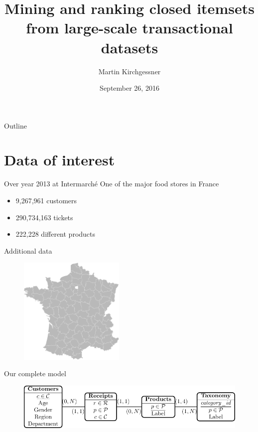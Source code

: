 \documentclass[table]{beamer}
\title[PhD defense]{Mining and ranking closed itemsets from large-scale transactional datasets}
\author[M. Kirchgessner]{Martin Kirchgessner}
\institute[LIG]{
  Laboratoire d'Informatique de Grenoble\\
	\texttt{martin.kirchgessner@imag.fr}
}
\date[September 26, 2016]{September 26, 2016}
\begin{document}
\begin{frame}[plain]
	\titlepage
\end{frame}

\begin{frame}{Outline}
  \tableofcontents
\end{frame}




\section{Data of interest}


\begin{frame}{Over year 2013 at Intermarché}
One of the major food stores in France
\begin{itemize}
  \item 9,267,961 customers
  \item 290,734,163 tickets
  \item 222,228 different products
\end{itemize}
\end{frame}

\begin{frame}[t]{Additional data}
  \begin{figure}
    \includegraphics[width=0.45\textwidth]{fig/departements.pdf}
  \end{figure}
\end{frame}


\begin{frame}{Our complete model}
  \begin{figure}
    \includegraphics[width=\textwidth]{../tikz/input_model_standalone}
  \end{figure}
\end{frame}
\end{document}
